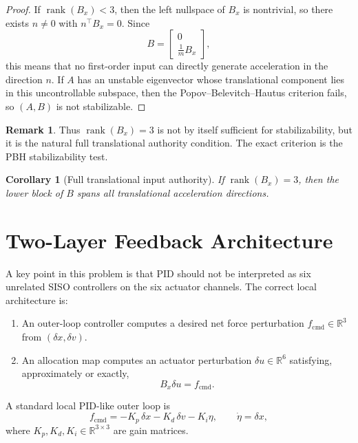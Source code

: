 \documentclass[11pt]{article}
\newtheorem{corollary}{Corollary}
\theoremstyle{definition}
\newtheorem{remark}{Remark}
\begin{document}
\begin{proof}
If $\operatorname{rank}(B_x)<3$, then the left nullspace of $B_x$ is nontrivial, so there exists $n\neq 0$ with $n^\top B_x=0$. Since
\[
B=
\begin{bmatrix}
0\\
\frac{1}{m}B_x
\end{bmatrix},
\]
this means that no first-order input can directly generate acceleration in the direction $n$. If $A$ has an unstable eigenvector whose translational component lies in this uncontrollable subspace, then the Popov--Belevitch--Hautus criterion fails, so $(A,B)$ is not stabilizable.
\end{proof}

\begin{remark}
Thus $\operatorname{rank}(B_x)=3$ is not by itself sufficient for stabilizability, but it is the natural full translational authority condition. The exact criterion is the PBH stabilizability test.
\end{remark}

\begin{corollary}[Full translational input authority]
If $\operatorname{rank}(B_x)=3$, then the lower block of $B$ spans all translational acceleration directions.
\end{corollary}

\section{Two-Layer Feedback Architecture}

A key point in this problem is that PID should not be interpreted as six unrelated SISO controllers on the six actuator channels. The correct local architecture is:

\begin{enumerate}[label=\textbf{Step \arabic*:},leftmargin=1.6cm]
\item An outer-loop controller computes a desired net force perturbation $f_{\mathrm{cmd}}\in\mathbb{R}^3$ from $(\delta x,\delta v)$.
\item An allocation map computes an actuator perturbation $\delta u\in\mathbb{R}^6$ satisfying, approximately or exactly,
\[
B_x\delta u=f_{\mathrm{cmd}}.
\]
\end{enumerate}

A standard local PID-like outer loop is
\[
f_{\mathrm{cmd}} = -K_p\,\delta x - K_d\,\delta v - K_i\eta,
\qquad
\dot\eta=\delta x,
\]
where $K_p,K_d,K_i\in\mathbb{R}^{3\times 3}$ are gain matrices.
\end{document}
